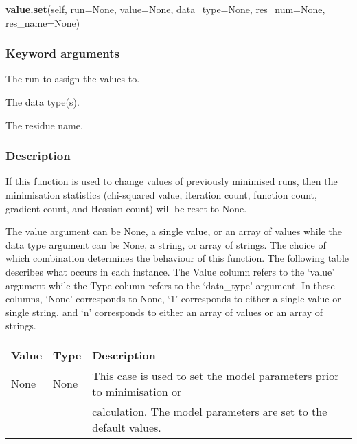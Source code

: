 \textsf{\textbf{value.set}(self, run=None, value=None, data\_type=None, res\_num=None, res\_name=None)}


\subsubsection{Keyword arguments}

  The run to assign the values to.

  The data type(s).

  The residue name.

\subsubsection{Description}

If this function is used to change values of previously minimised runs, then the
minimisation statistics (chi-squared value, iteration count, function count, gradient count,
and Hessian count) will be reset to None.


The value argument can be None, a single value, or an array of values while the data type
argument can be None, a string, or array of strings.  The choice of which combination
determines the behaviour of this function.  The following table describes what occurs in
each instance.  The Value column refers to the `value' argument while the Type column refers
to the `data\_type' argument.  In these columns, `None' corresponds to None, `1' corresponds
to either a single value or single string, and `n' corresponds to either an array of values
or an array of strings.



\begin{center}
\begin{tabular}{lll}
\toprule
Value & Type & Description \\
\midrule
 None   &  None   &  This case is used to set the model parameters prior to minimisation or    \\
        &         &  calculation.  The model parameters are set to the default values.         \\
\bottomrule
\end{tabular}
\end{center}

